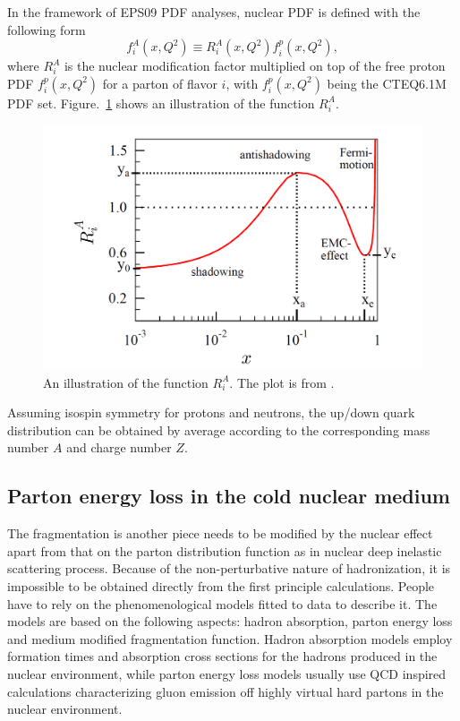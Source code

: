 In the framework of EPS09 PDF analyses, nuclear PDF is defined with the following form
\begin{equation}
f^{A}_{i}(x, Q^{2}) \equiv R^{A}_{i}(x, Q^{2})f^{p}_{i}(x, Q^{2}),
\end{equation} 
where $R^{A}_{i}$ is the nuclear modification factor multiplied on top of the
free proton PDF $f^{p}_{i}(x, Q^{2})$ for a parton of flavor $i$, 
with $f^{p}_{i}(x, Q^{2})$ being the CTEQ6.1M PDF set. Figure.~\ref{fig:shadowing} shows an illustration of the function $R^{A}_{i}$. 
\begin{figure}
\centering
\includegraphics[width=1.0\textwidth]{plots/chpt5/shadowing.png} 
\caption[The plot showing the ratio of parton distribution function in the nuclear medium divided by the proton gluon distribution function] {
An illustration of the function $R^{A}_{i}$. The plot is from \cite{Eskola:2009uj}.}
\label{fig:shadowing}
\end{figure}


Assuming isospin symmetry for protons and neutrons, the up/down quark
distribution can be obtained by average according to the corresponding mass
number $A$ and charge number $Z$.


\subsection{Parton energy loss in the cold nuclear medium } \label{sec:energy_loss}
The fragmentation is another piece needs to be modified by the nuclear effect
apart from that on the parton distribution function as in nuclear deep inelastic
scattering process. Because of the non-perturbative nature of hadronization, it
is impossible to be obtained directly from the first principle calculations. People have
to rely on the phenomenological models fitted to data to describe it. The models
are based on the following aspects: hadron absorption, parton energy loss and medium
modified fragmentation function. Hadron absorption models employ formation
times and absorption cross sections for the hadrons produced in the nuclear
environment, while parton energy loss models usually use QCD inspired
calculations characterizing gluon emission off highly virtual hard partons in
the nuclear environment.

